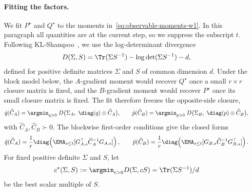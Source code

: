 \paragraph{Fitting the factors.} We fit $P^\star$ and $Q^\star$ to the
moments in~\eqref{eq:observable-moments-w1}. In this paragraph all
quantities are at the current step, so we suppress the subscript $t$.
Following KL-Shampoo~\cite{klshampoo}, we use the log-determinant
divergence~\cite{logdetdiv}
\[
  D(\Sigma,S)=\Tr(\Sigma S^{-1})-\log\det(\Sigma S^{-1})-d,
\]
defined for positive definite matrices $\Sigma$ and $S$ of common dimension
$d$. Under the block model below, the $A$-gradient moment would recover
$Q^\star$ once a small $r\times r$ closure matrix is fixed, and the
$B$-gradient moment would recover $P^\star$ once its small closure matrix is
fixed. The fit therefore freezes the opposite-side closure,
\begin{equation}\label{eq:factor-fit-w1}
  \hat{q}(\widehat C_A)
  =\argmin_{q>0}\;
  D\big(\Sigma_A,\; \diag(q) \otimes \widehat C_A\big),
  \qquad
  \hat{p}(\widehat C_B)
  =\argmin_{p>0}\;
  D\big(\Sigma_B,\;\diag(p) \otimes \widehat C_B\big),
\end{equation}
with $\widehat C_A,\widehat C_B\succ0$. The blockwise first-order conditions
give the closed forms
\[
  \hat{q}(\widehat C_A)=\frac1r\diag\!\left(\EMA_{s \leq t}[G_{A,s}^\top \widehat C_A^{-1}G_{A,s}]\right),
  \qquad
  \hat{p}(\widehat C_B)=\frac1r\diag\!\left(\EMA_{s \leq t}[G_{B,s} \widehat C_B^{-1}G_{B,s}^\top]\right).
\]
For fixed positive definite $\Sigma$ and $S$, let
\[
  c^\star(\Sigma,S) :=\argmin_{c>0}D(\Sigma,cS)=\Tr(\Sigma S^{-1})/d
\]
be the best scalar multiple of $S$.

